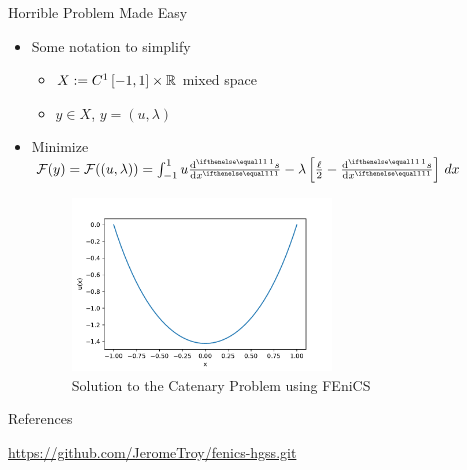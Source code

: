 \documentclass[serif]{beamer}
\begin{document}
\begin{frame}{Horrible Problem Made Easy}
    \begin{itemize}
        \item Some notation to simplify
        \begin{itemize}
            \item $X:= C^1\left[-1, 1\right] \times \mathbb{R}$ mixed space
            \item $y \in X$, $y = (u, \lambda)$
        \end{itemize}
        \item Minimize $\mathcal F(y) = \mathcal F((u, \lambda)) = \int_{-1}^1 u \der{s}{x} - \lambda \left[\frac{\ell}{2} - 
            \der{s}{x}\right] \, dx$
        \begin{figure}
            \centering
            \includegraphics[width=0.65\textwidth,height=0.65\textheight,keepaspectratio]
            {figures/fenics-catenary.pdf}
            \caption{Solution to the Catenary Problem using FEniCS}
            \label{fig:fenics-catenary}
        \end{figure}
    \end{itemize}
\end{frame}


\begin{frame}{References}
    \nocite{*}
    
    
    
    \url{https://github.com/JeromeTroy/fenics-hgss.git}
\end{frame}
\end{document}
